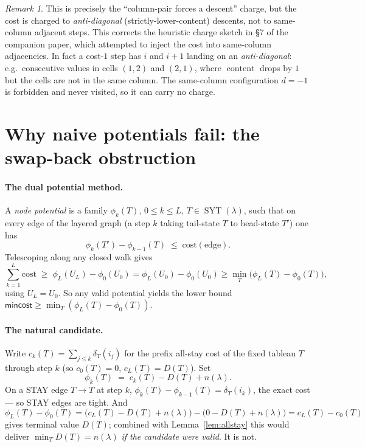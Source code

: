 \documentclass[11pt]{article}
\theoremstyle{plain}
\theoremstyle{remark}
\newtheorem{remark}{Remark}
\newcommand{\SYT}{\operatorname{SYT}}
\newcommand{\cont}{\operatorname{content}}
\newcommand{\mincost}{\mathsf{mincost}}
\begin{document}
\begin{remark}
This is precisely the ``column-pair forces a descent'' charge, but the cost
is charged to \emph{anti-diagonal} (strictly-lower-content) descents, not to
same-column adjacent steps. This corrects the heuristic charge sketch in \S7
of the companion paper, which attempted to inject the cost into same-column
adjacencies. In fact a cost-$1$ step has $i$ and $i{+}1$ landing on an
\emph{anti-diagonal}: e.g.\ consecutive values in cells $(1,2)$ and $(2,1)$,
where $\cont$ drops by $1$ but the cells are not in the same column. The
same-column configuration $d=-1$ is forbidden and never visited, so it can
carry no charge.
\end{remark}

\section{Why naive potentials fail: the swap-back obstruction}\label{sec:obstruction}

\paragraph{The dual potential method.}
A \emph{node potential} is a family $\phi_k(T)$, $0\le k\le L$, $T\in\SYT(\lambda)$,
such that on every edge of the layered graph (a step $k$ taking tail-state
$T$ to head-state $T'$) one has
\[
  \phi_k(T')-\phi_{k-1}(T)\;\le\;\mathrm{cost}(\text{edge}).
\]
Telescoping along any closed walk gives
\[
  \sum_{k=1}^{L}\mathrm{cost}\;\ge\;\phi_L(U_L)-\phi_0(U_0)
                                  =\phi_L(U_0)-\phi_0(U_0)
                                  \ge \min_T\bigl(\phi_L(T)-\phi_0(T)\bigr),
\]
using $U_L=U_0$. So any valid potential yields the lower bound
$\mincost\ge\min_T(\phi_L(T)-\phi_0(T))$.

\paragraph{The natural candidate.}
Write $c_k(T)=\sum_{j\le k}\delta_T(i_j)$ for the prefix all-stay cost of the
fixed tableau $T$ through step $k$ (so $c_0(T)=0$, $c_L(T)=D(T)$). Set
\[
  \phi_k(T)\;=\;c_k(T)-D(T)+n(\lambda).
\]
On a STAY edge $T\to T$ at step $k$, $\phi_k(T)-\phi_{k-1}(T)=\delta_T(i_k)$,
the exact cost --- so STAY edges are tight. And
\[
  \phi_L(T)-\phi_0(T)=\bigl(c_L(T)-D(T)+n(\lambda)\bigr)-\bigl(0-D(T)+n(\lambda)\bigr)=c_L(T)-c_0(T)
\]
gives terminal value $D(T)$; combined with Lemma~\ref{lem:allstay} this
would deliver $\min_T D(T)=n(\lambda)$ \emph{if the candidate were valid}.
It is not.
\end{document}
